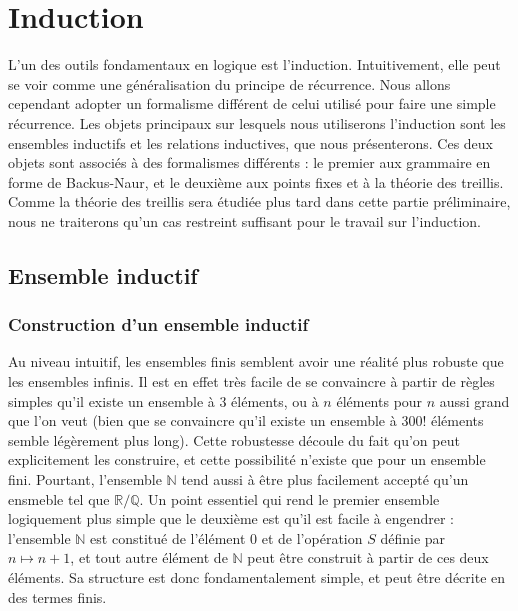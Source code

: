 \chapter[Induction]{Induction}
\label{chp.induction}

\minitoc

L'un des outils fondamentaux en logique est l'induction. Intuitivement, elle
peut se voir comme une généralisation du principe de récurrence. Nous allons
cependant adopter un formalisme différent de celui utilisé pour faire une simple
récurrence. Les objets principaux sur lesquels nous utiliserons l'induction sont
les ensembles inductifs et les relations inductives, que nous présenterons. Ces
deux objets sont associés à des formalismes différents : le premier aux
grammaire en forme de Backus-Naur, et le deuxième aux points fixes et à la
théorie des treillis. Comme la théorie des treillis sera étudiée plus tard dans
cette partie préliminaire, nous ne traiterons qu'un cas restreint suffisant pour
le travail sur l'induction.

\section{Ensemble inductif}

\subsection{Construction d'un ensemble inductif}

Au niveau intuitif, les ensembles finis semblent avoir une réalité plus
robuste que les ensembles infinis. Il est en effet très facile de se convaincre
à partir de règles simples qu'il existe un ensemble à $3$ éléments, ou à $n$
éléments pour $n$ aussi grand que l'on veut (bien que se convaincre qu'il existe
un ensemble à $300!$ éléments semble légèrement plus long). Cette robustesse
découle du fait qu'on peut explicitement les construire, et cette possibilité
n'existe que pour un ensemble fini. Pourtant, l'ensemble $\mathbb N$ tend aussi
à être plus facilement accepté qu'un ensmeble tel que $\mathbb R / \mathbb Q$.
Un point essentiel qui rend le premier ensemble logiquement plus simple que le
deuxième est qu'il est facile à engendrer : l'ensemble $\mathbb N$ est constitué
de l'élément $0$ et de l'opération $S$ définie par $n \mapsto n + 1$, et tout
autre élément de $\mathbb N$ peut être construit à partir de ces deux éléments.
Sa structure est donc fondamentalement simple, et peut être décrite en des
termes finis.


